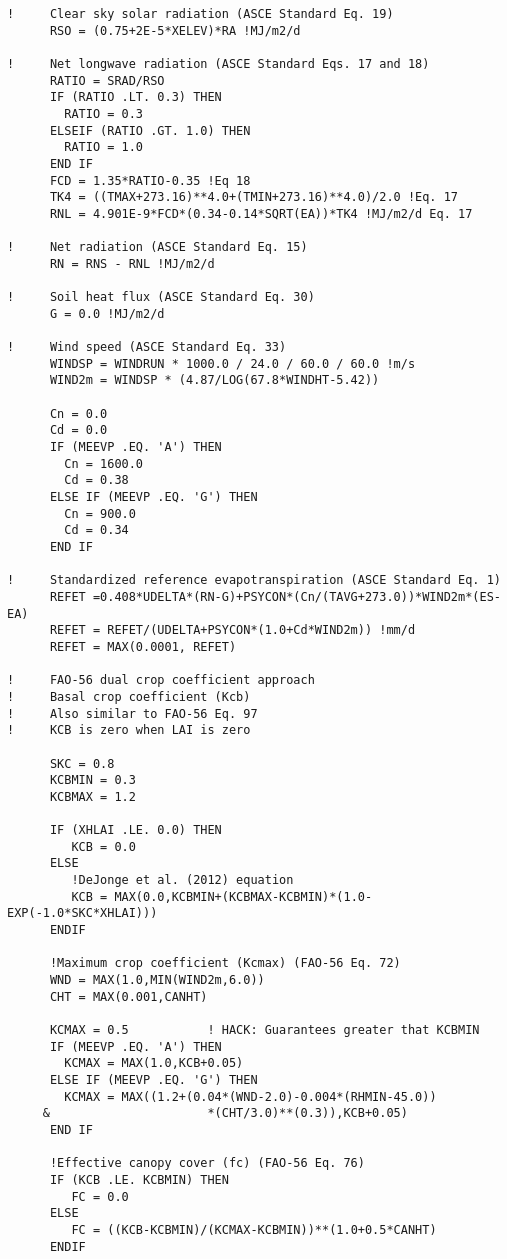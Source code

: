 \begin{verbatim}
!     Clear sky solar radiation (ASCE Standard Eq. 19)
      RSO = (0.75+2E-5*XELEV)*RA !MJ/m2/d

!     Net longwave radiation (ASCE Standard Eqs. 17 and 18)
      RATIO = SRAD/RSO
      IF (RATIO .LT. 0.3) THEN
        RATIO = 0.3
      ELSEIF (RATIO .GT. 1.0) THEN
        RATIO = 1.0
      END IF
      FCD = 1.35*RATIO-0.35 !Eq 18
      TK4 = ((TMAX+273.16)**4.0+(TMIN+273.16)**4.0)/2.0 !Eq. 17
      RNL = 4.901E-9*FCD*(0.34-0.14*SQRT(EA))*TK4 !MJ/m2/d Eq. 17

!     Net radiation (ASCE Standard Eq. 15)
      RN = RNS - RNL !MJ/m2/d

!     Soil heat flux (ASCE Standard Eq. 30)
      G = 0.0 !MJ/m2/d

!     Wind speed (ASCE Standard Eq. 33)
      WINDSP = WINDRUN * 1000.0 / 24.0 / 60.0 / 60.0 !m/s
      WIND2m = WINDSP * (4.87/LOG(67.8*WINDHT-5.42))

      Cn = 0.0
      Cd = 0.0
      IF (MEEVP .EQ. 'A') THEN
        Cn = 1600.0
        Cd = 0.38
      ELSE IF (MEEVP .EQ. 'G') THEN
        Cn = 900.0
        Cd = 0.34
      END IF

!     Standardized reference evapotranspiration (ASCE Standard Eq. 1)
      REFET =0.408*UDELTA*(RN-G)+PSYCON*(Cn/(TAVG+273.0))*WIND2m*(ES-EA)
      REFET = REFET/(UDELTA+PSYCON*(1.0+Cd*WIND2m)) !mm/d
      REFET = MAX(0.0001, REFET)

!     FAO-56 dual crop coefficient approach
!     Basal crop coefficient (Kcb)
!     Also similar to FAO-56 Eq. 97
!     KCB is zero when LAI is zero

      SKC = 0.8
      KCBMIN = 0.3
      KCBMAX = 1.2

      IF (XHLAI .LE. 0.0) THEN
         KCB = 0.0
      ELSE
         !DeJonge et al. (2012) equation
         KCB = MAX(0.0,KCBMIN+(KCBMAX-KCBMIN)*(1.0-EXP(-1.0*SKC*XHLAI)))
      ENDIF

      !Maximum crop coefficient (Kcmax) (FAO-56 Eq. 72)
      WND = MAX(1.0,MIN(WIND2m,6.0))
      CHT = MAX(0.001,CANHT)

      KCMAX = 0.5           ! HACK: Guarantees greater that KCBMIN
      IF (MEEVP .EQ. 'A') THEN
        KCMAX = MAX(1.0,KCB+0.05)
      ELSE IF (MEEVP .EQ. 'G') THEN
        KCMAX = MAX((1.2+(0.04*(WND-2.0)-0.004*(RHMIN-45.0))
     &                      *(CHT/3.0)**(0.3)),KCB+0.05)
      END IF

      !Effective canopy cover (fc) (FAO-56 Eq. 76)
      IF (KCB .LE. KCBMIN) THEN
         FC = 0.0
      ELSE
         FC = ((KCB-KCBMIN)/(KCMAX-KCBMIN))**(1.0+0.5*CANHT)
      ENDIF


\end{verbatim}
